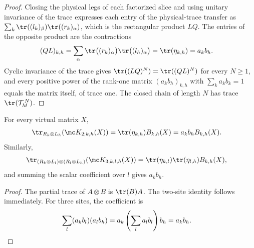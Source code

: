 \begin{proof}
    \leanok
    Closing the physical legs of each factorized slice and using unitary
    invariance of the trace expresses each entry of the physical-trace
    transfer as $\sum_k\tr((l_k)_\beta)\tr((r_k)_\alpha)$, which is the
    rectangular product $LQ$. The entries of the opposite product are the
    contractions
    \begin{align}
        (QL)_{k,h}
         & =\sum_\alpha\tr\bigl((r_k)_\alpha\bigr)\tr\bigl((l_h)_\alpha\bigr)
        =\tr(\eta_{k,h})=a_kb_h.
        \notag
    \end{align}
    Cyclic invariance of the trace gives
    $\tr((LQ)^N)=\tr((QL)^N)$ for every $N\geq1$, and every positive power
    of the rank-one matrix $(a_kb_h)_{k,h}$ with $\sum_ka_kb_k=1$ equals the
    matrix itself, of trace one. The closed chain of length $N$ has trace
    $\tr(\mathcal T_M^{\,N})$.
\end{proof}

\begin{lemma}
    \label{thm:mpdo_sector_closure_partial_traces}
    \leanok
    For every virtual matrix $X$,
    \begin{align}
        \tr_{R_k\otimes L_h}\!\left(\mc K_{2;k,h}(X)\right)
         & =\tr(\eta_{k,h})B_{k,h}(X)
        =a_kb_h B_{k,h}(X).
        \notag
    \end{align}
    Similarly,
    \begin{align}
        \tr_{(R_k\otimes L_l)\otimes(R_l\otimes L_h)}
        \!\left(\mc K_{3;k,l,h}(X)\right)
         & =\tr(\eta_{k,l})\tr(\eta_{l,h})B_{k,h}(X),
        \notag
    \end{align}
    and summing the scalar coefficient over $l$ gives $a_kb_h$.
\end{lemma}

\begin{proof}
    \leanok
    The partial trace of $A\otimes B$ is $\tr(B)A$. The two-site identity
    follows immediately. For three sites, the coefficient is
    \begin{align}
        \sum_l (a_kb_l)(a_lb_h)
         & =a_k\left(\sum_l a_lb_l\right)b_h
        =a_kb_h.
        \notag
    \end{align}
\end{proof}
